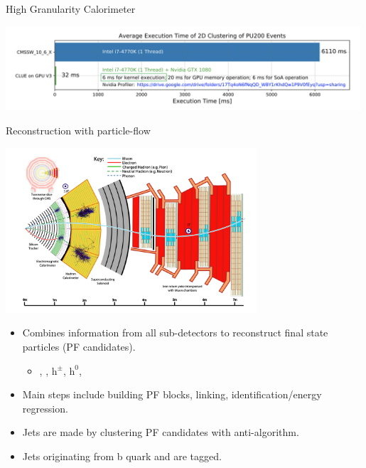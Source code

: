 \begin{frame}{High Granularity Calorimeter}
    \begin{center}
        \includegraphics[width=0.99\textwidth]{slides/figures/clueTime.png}
    \end{center}
\end{frame}



\begin{frame}{Reconstruction with particle-flow}
\smaller
    \begin{center}
        \includegraphics[width=0.7\textwidth]{chapters/CMSExperiment/sectionReconstruction/figures/pfa.png}
    \end{center}
    \begin{itemize} 
        \item Combines information from all sub-detectors to reconstruct final state particles (PF candidates). 
        \vspace{-0.05\textheight}
        \begin{itemize}
        \smaller
            \item \PGm, \Pe, $\mathrm{h}^{\pm}$, $\mathrm{h}^{0}$, \PGg
        \end{itemize}
        \item Main steps include building PF blocks, linking, identification/energy regression.
        \item Jets are made by clustering PF candidates with anti-\kt algorithm. 
        \item Jets originating from b quark and \textcolor{red}{\PGth} are tagged.
    \end{itemize}
\end{frame}

